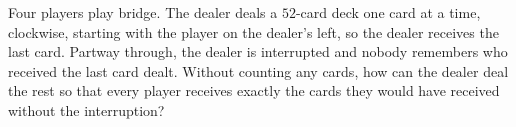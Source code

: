 Four players play bridge. The dealer deals a $52$-card deck one card at a time, clockwise, starting with the player on the dealer's left, so the dealer receives the last card. Partway through, the dealer is interrupted and nobody remembers who received the last card dealt. Without counting any cards, how can the dealer deal the rest so that every player receives exactly the cards they would have received without the interruption?
